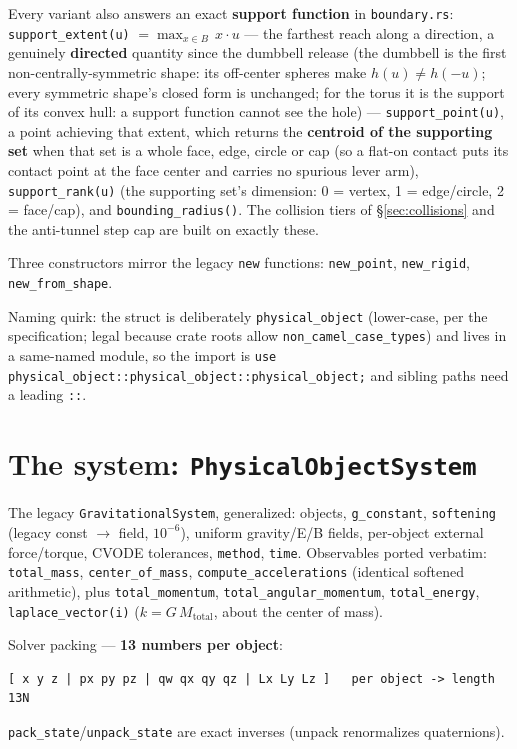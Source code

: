 \documentclass[11pt]{article}
\newcommand{\code}[1]{\texttt{#1}}
\begin{document}
Every variant also answers an exact \textbf{support function} in
\code{boundary.rs}: \code{support\_extent(u)} $= \max_{x\in B}\,x\cdot u$
--- the farthest reach along a direction, a genuinely \textbf{directed}
quantity since the dumbbell release (the dumbbell is the first
non-centrally-symmetric shape: its off-center spheres make
$h(u) \ne h(-u)$; every symmetric shape's closed form is unchanged; for
the torus it is the support of its convex hull: a support function
cannot see the hole) ---
\code{support\_point(u)}, a point achieving that extent, which returns
the \textbf{centroid of the supporting set} when that set is a whole
face, edge, circle or cap (so a flat-on contact puts its contact point
at the face center and carries no spurious lever arm),
\code{support\_rank(u)} (the supporting set's dimension: 0 = vertex,
1 = edge/circle, 2 = face/cap), and \code{bounding\_radius()}. The
collision tiers of \S\ref{sec:collisions} and the anti-tunnel step cap
are built on exactly these.

Three constructors mirror the legacy \code{new} functions:
\code{new\_point}, \code{new\_rigid}, \code{new\_from\_shape}.

Naming quirk: the struct is deliberately \code{physical\_object}
(lower-case, per the specification; legal because crate roots allow
\code{non\_camel\_case\_types}) and lives in a same-named module, so the
import is
\code{use physical\_object::physical\_object::physical\_object;} and
sibling paths need a leading \code{::}.

\section{The system: \code{PhysicalObjectSystem}}

The legacy \code{GravitationalSystem}, generalized: objects,
\code{g\_constant}, \code{softening} (legacy const $\to$ field,
$10^{-6}$), uniform gravity/E/B fields, per-object external
force/torque, CVODE tolerances, \code{method}, \code{time}.
Observables ported verbatim: \code{total\_mass},
\code{center\_of\_mass}, \code{compute\_accelerations} (identical
softened arithmetic), plus \code{total\_momentum},
\code{total\_angular\_momentum}, \code{total\_energy},
\code{laplace\_vector(i)} ($k = G\,M_{\text{total}}$, about the center
of mass).

Solver packing --- \textbf{13 numbers per object}:
\begin{lstlisting}
[ x y z | px py pz | qw qx qy qz | Lx Ly Lz ]   per object -> length 13N
\end{lstlisting}
\code{pack\_state}/\code{unpack\_state} are exact inverses (unpack
renormalizes quaternions).
\end{document}
